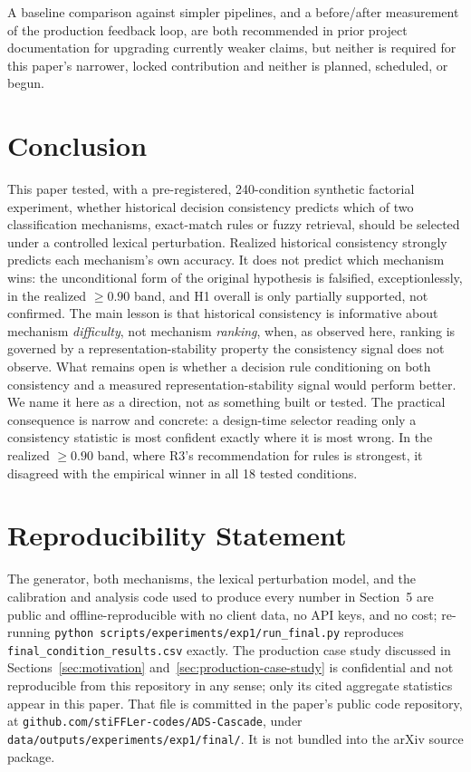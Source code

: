 \documentclass[11pt]{article}
\begin{document}
A baseline comparison against simpler pipelines, and a before/after
measurement of the production feedback loop, are both recommended in prior
project documentation for upgrading currently weaker claims, but neither is
required for this paper's narrower, locked contribution and neither is
planned, scheduled, or begun.

\section{Conclusion}
\label{sec:conclusion}

This paper tested, with a pre-registered, 240-condition synthetic factorial
experiment, whether historical decision consistency predicts which of two
classification mechanisms, exact-match rules or fuzzy retrieval, should
be selected under a controlled lexical perturbation. Realized historical
consistency strongly predicts each mechanism's own accuracy. It does not
predict which mechanism wins: the unconditional form of the original
hypothesis is falsified, exceptionlessly, in the realized $\geq0.90$ band,
and H1 overall is only partially supported, not confirmed. The main lesson is
that historical consistency is informative about mechanism \emph{difficulty},
not mechanism \emph{ranking}, when, as observed here, ranking is governed by
a representation-stability property the consistency signal does not observe.
What remains open is whether a decision rule conditioning on both consistency
and a measured representation-stability signal would perform better. We name it here as a direction, not as something built or
tested. The practical consequence is narrow
and concrete: a design-time selector reading only a consistency statistic is
most confident exactly where it is most wrong. In the realized $\geq0.90$
band, where R3's recommendation for rules is strongest, it disagreed with the
empirical winner in all 18 tested conditions.

\section*{Reproducibility Statement}

\begin{sloppypar}
The generator, both mechanisms, the lexical perturbation model, and the
calibration and analysis code used to produce every number in Section~5 are
public and offline-reproducible with no client data, no API keys, and no
cost; re-running \texttt{python scripts/experiments/exp1/run\_final.py}
reproduces \texttt{final\_condition\_results.csv} exactly. The production
case study discussed in Sections~\ref{sec:motivation}
and~\ref{sec:production-case-study} is confidential and not
reproducible from this repository in any sense; only its cited aggregate
statistics appear in this paper. That file is committed in the paper's public
code repository, at
\texttt{github.com/stiFFLer-codes/ADS-Cascade}, under
\texttt{data/outputs/experiments/exp1/final/}. It is not bundled into the
arXiv source package.
\end{sloppypar}
\end{document}
